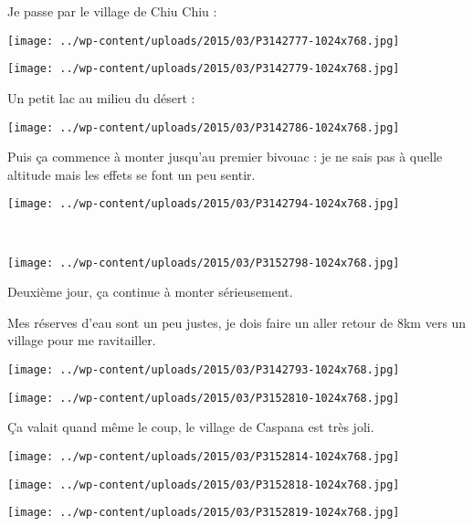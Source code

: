 \pagebreak
Je passe par le village de Chiu Chiu :
\begin{center} \texttt{[image: ../wp-content/uploads/2015/03/P3142777-1024x768.jpg]} \end{center}
\begin{center} \texttt{[image: ../wp-content/uploads/2015/03/P3142779-1024x768.jpg]} \end{center}
\vspace{-\topsep}
\vspace{-3.25mm}

\pagebreak
Un petit lac au milieu du désert :
\begin{center} \texttt{[image: ../wp-content/uploads/2015/03/P3142786-1024x768.jpg]} \end{center}

Puis ça commence à monter jusqu'au premier bivouac : je ne sais pas à quelle altitude mais les effets se font un peu sentir.\\
\begin{center} \texttt{[image: ../wp-content/uploads/2015/03/P3142794-1024x768.jpg]} \end{center}
\vspace{-\topsep}
\pagebreak
~
\begin{center} \texttt{[image: ../wp-content/uploads/2015/03/P3152798-1024x768.jpg]} \end{center}

 Deuxième jour, ça continue à monter sérieusement.

 Mes réserves d'eau sont un peu justes, je dois faire un aller retour de 8km vers un village pour me ravitailler. 
\begin{center} \texttt{[image: ../wp-content/uploads/2015/03/P3142793-1024x768.jpg]} \end{center}
\begin{center} \texttt{[image: ../wp-content/uploads/2015/03/P3152810-1024x768.jpg]} \end{center}

 Ça valait quand même le coup, le village de Caspana est très joli.
\begin{center} \texttt{[image: ../wp-content/uploads/2015/03/P3152814-1024x768.jpg]} \end{center}
\begin{center} \texttt{[image: ../wp-content/uploads/2015/03/P3152818-1024x768.jpg]} \end{center}
\vfill
\begin{center} \texttt{[image: ../wp-content/uploads/2015/03/P3152819-1024x768.jpg]} \end{center}
\vspace{-\topsep}
\vspace{-0.75mm}

